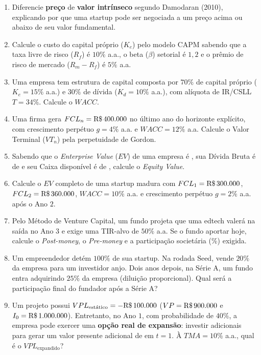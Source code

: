 \begin{enumerate}[leftmargin=1.6em, itemsep=5pt]
  \item Diferencie \textbf{preço} de \textbf{valor intrínseco} segundo Damodaran (2010), explicando por que uma startup pode ser negociada a um preço acima ou abaixo de seu valor fundamental. \espacoResolucao[1.5cm]
  \item Calcule o custo do capital próprio ($K_e$) pelo modelo CAPM sabendo que a taxa livre de risco ($R_f$) é $10\%$ a.a., o beta ($\beta$) setorial é $1{,}2$ e o prêmio de risco de mercado ($R_m - R_f$) é $5\%$ a.a. \espacoResolucao[1.5cm]
  \item Uma empresa tem estrutura de capital composta por $70\%$ de capital próprio ($K_e = 15\%$ a.a.) e $30\%$ de dívida ($K_d = 10\%$ a.a.), com alíquota de IR/CSLL $T = 34\%$. Calcule o $WACC$. \espacoResolucao[1.6cm]
  \item Uma firma gera $FCL_n = \text{R\$\,}{400.000}$ no último ano do horizonte explícito, com crescimento perpétuo $g = 4\%$ a.a. e $WACC = 12\%$ a.a. Calcule o Valor Terminal ($VT_n$) pela perpetuidade de Gordon. \espacoResolucao[1.6cm]
  \item Sabendo que o \textit{Enterprise Value} ($EV$) de uma empresa é , sua Dívida Bruta é de  e seu Caixa disponível é de , calcule o \textit{Equity Value}. \espacoResolucao[1.5cm]
  \item Calcule o $EV$ completo de uma startup madura com $FCL_1 = \text{R\$\,}{300.000}$, $FCL_2 = \text{R\$\,}{360.000}$, $WACC = 10\%$ a.a. e crescimento perpétuo $g = 2\%$ a.a. após o Ano $2$. \espacoResolucao[2.0cm]
  \item Pelo Método de Venture Capital, um fundo projeta que uma edtech valerá  na saída no Ano $3$ e exige uma TIR-alvo de $50\%$ a.a. Se o fundo aportar  hoje, calcule o \textit{Post-money}, o \textit{Pre-money} e a participação societária (\%) exigida. \espacoResolucao[1.9cm]
  \item Um empreendedor detém $100\%$ de sua startup. Na rodada Seed, vende $20\%$ da empresa para um investidor anjo. Dois anos depois, na Série A, um fundo entra adquirindo $25\%$ da empresa (diluição proporcional). Qual será a participação final do fundador após a Série A? \espacoResolucao[1.6cm]
  \item Um projeto possui $VPL_{\text{estático}} = -\text{R\$\,}{100.000}$ ($VP = \text{R\$\,}{900.000}$ e $I_0 = \text{R\$\,}{1.000.000}$). Entretanto, no Ano $1$, com probabilidade de $40\%$, a empresa pode exercer uma \textbf{opção real de expansão}: investir  adicionais para gerar um valor presente adicional de  em $t=1$. À $TMA = 10\%$ a.a., qual é o $VPL_{\text{expandido}}$? \espacoResolucao[1.9cm]

\end{enumerate}
